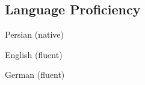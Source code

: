 \documentclass[../main.tex]{subfiles}
\begin{document}
\begin{category}
\section{Language Proficiency}
    \begin{enumerate*}[label=$\diamond$]
        \item Persian (native) \qquad \qquad \qquad
        \item English (fluent) \qquad \qquad \qquad
        \item German (fluent)
    \end{enumerate*}
\end{category}
\end{document}
